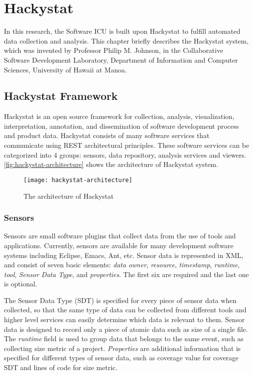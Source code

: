 \chapter{Hackystat}
In this research, the Software ICU is built upon Hackystat to fulfill automated data collection and analysis. This chapter briefly describes the Hackystat system, which was invented by Professor Philip M. Johnson, in the Collaborative Software Development Laboratory, Department of Information and Computer Sciences, University of Hawaii at Manoa. 
 
\section{Hackystat Framework}
Hackystat is an open source framework for collection, analysis, visualization, interpretation, annotation, and dissemination of software development process and product data\cite{hackystat}. Hackystat consists of many software services that communicate using REST architectural principles\cite{rest}. These software services can be categorized into 4 groups: sensors, data repository, analysis services and viewers. \autoref{fig:hackystat-architecture} shows the architecture of Hackystat system. 

\begin{figure}[htbp]
   \centering
   \texttt{[image: hackystat-architecture]} 
   \caption{The architecture of Hackystat}
   \label{fig:hackystat-architecture}
\end{figure}

\subsection{Sensors}
Sensors are small software plugins that collect data from the use of tools and applications. Currently, sensors are available for many development software systems including Eclipse, Emacs, Ant, etc. Sensor data is represented in XML, and consist of seven basic elements: {\it data owner}, {\it resource}, {\it timestamp}, {\it runtime}, {\it tool}, {\it Sensor Data Type}, and {\it  properties}. The first six are required and the last one is optional. 

The Sensor Data Type (SDT) is specified for every piece of sensor data when collected, so that the same type of data can be collected from different tools and higher level services can easily determine which data is relevant to them. Sensor data is designed to record only a piece of atomic data such as size of a single file. The  {\it runtime} field is used to group data that belongs to the same event, such as collecting size metric of a project.  {\it Properties} are additional information that is specified for different types of sensor data, such as coverage value for coverage SDT and lines of code for size metric. 

